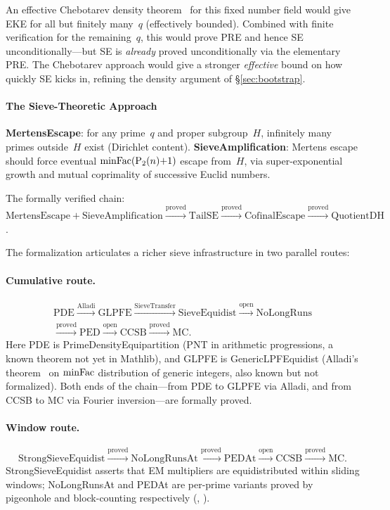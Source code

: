 An effective Chebotarev density theorem~\cite{LagariasOdlyzko1977}
for this fixed number field
would give EKE for all but finitely many~$q$ (effectively bounded).
Combined with finite verification for the remaining~$q$, this would
prove PRE and hence SE unconditionally---but SE is
\emph{already} proved unconditionally via the elementary PRE.
The Chebotarev approach would give a stronger \emph{effective}
bound on how quickly SE kicks in, refining the density argument of
\S\ref{sec:bootstrap}.

\paragraph{The Sieve-Theoretic Approach}

\textbf{Mertens\-Escape}: for any prime~$q$ and proper
subgroup~$H$, infinitely many primes outside~$H$ exist
(Dirichlet content).
\textbf{Sieve\-Amplification}: Mertens escape should force
eventual $\mathrm{minFac}(\mathrm{P}_{2}(n){+}1)$ escape from~$H$, via
super-exponential growth and mutual coprimality of
successive Euclid numbers.

The formally verified chain:
$\mathrm{MertensEscape} + \mathrm{SieveAmplification}
\xrightarrow{\text{proved}}
\mathrm{TailSE} \xrightarrow{\text{proved}}
\mathrm{CofinalEscape} \xrightarrow{\text{proved}}
\mathrm{QuotientDH}$.

The formalization articulates a richer sieve infrastructure in two parallel
routes:

\paragraph{Cumulative route.}
\begin{gather*}
\mathrm{PDE}
\xrightarrow{\text{Alladi}}
\mathrm{GLPFE}
\xrightarrow{\mathrm{SieveTransfer}}
\mathrm{SieveEquidist}
\xrightarrow{\text{open}}
\mathrm{NoLongRuns} \\
\xrightarrow{\text{proved}}
\mathrm{PED}
\xrightarrow{\text{open}}
\mathrm{CCSB}
\xrightarrow{\text{proved}}
\mathrm{MC}.
\end{gather*}
Here PDE is PrimeDensityEquipartition (PNT in arithmetic progressions,
a known theorem not yet in Mathlib), and GLPFE is GenericLPFEquidist
(Alladi's theorem~\cite{Alladi1977} on $\mathrm{minFac}$ distribution of generic integers,
also known but not formalized).  Both ends of the chain---from PDE to
GLPFE via Alladi, and from CCSB to MC via Fourier inversion---are
formally proved.

\paragraph{Window route.}
\[
\mathrm{StrongSieveEquidist}
\xrightarrow{\text{proved}}
\mathrm{NoLongRunsAt}
\xrightarrow{\text{proved}}
\mathrm{PEDAt}
\xrightarrow{\text{open}}
\mathrm{CCSB}
\xrightarrow{\text{proved}}
\mathrm{MC}.
\]
StrongSieveEquidist asserts that EM multipliers are equidistributed
within sliding windows; NoLongRunsAt and PEDAt are per-prime variants
proved by pigeonhole and block-counting respectively
(,
).

